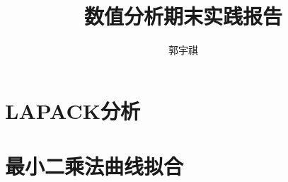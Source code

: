 \documentclass[a4paper]{article}
\begin{document}
 
\title{数值分析期末实践报告}
\author{郭宇祺}
\date{}
\maketitle
\normalsize
\section{LAPACK分析}

\section{最小二乘法曲线拟合}
\end{document}
